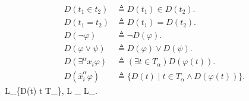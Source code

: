 \begin{align*}
D(t_1 \in t_2) &\triangleq D(t_1) \in D(t_2).\\
D(t_1 = t_2) &\triangleq D(t_1) = D(t_2).\\
D(\neg \varphi) &\triangleq \neg D(\varphi).\\
D(\varphi \lor \psi) &\triangleq D(\varphi) \lor D(\psi).\\
D(\exists^\alpha x_i \varphi) &\triangleq (\exists t \in T_\alpha) D(\varphi(t)).\\
D(\hat{x}_i^\alpha \varphi) &\triangleq \{D(t) \mid t \in T_\alpha \land D(\varphi(t))\}.
\end{align*}$$
$$L_\alpha \triangleq \{D(t) \mid t \in T_\alpha\}, \quad L \triangleq \bigcup_{\alpha \in {}} L_\alpha.$$

